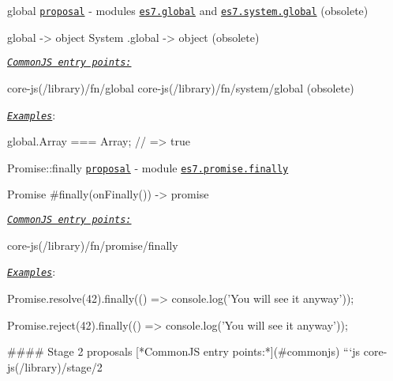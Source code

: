 \begin{DoxyItemize}
\item {\ttfamily global} \href{https://github.com/tc39/proposal-global}{\tt proposal} -\/ modules \href{https://github.com/zloirock/core-js/blob/v2.6.0/modules/es7.global.js}{\tt {\ttfamily es7.\+global}} and \href{https://github.com/zloirock/core-js/blob/v2.6.0/modules/es7.system.global.js}{\tt {\ttfamily es7.\+system.\+global}} (obsolete) 
\begin{DoxyCode}
global -> object
System
  .global -> object (obsolete)
\end{DoxyCode}
 \href{#commonjs}{\tt {\itshape Common\+JS entry points\+:}} 
\begin{DoxyCode}
core-js(/library)/fn/global
core-js(/library)/fn/system/global (obsolete)
\end{DoxyCode}
 \href{http://goo.gl/gEqMl7}{\tt {\itshape Examples}}\+: 
\begin{DoxyCode}
global.Array === Array; // => true
\end{DoxyCode}

\item {\ttfamily Promise\+::finally} \href{https://github.com/tc39/proposal-promise-finally}{\tt proposal} -\/ module \href{https://github.com/zloirock/core-js/blob/v2.6.0/modules/es7.promise.finally.js}{\tt {\ttfamily es7.\+promise.\+finally}} 
\begin{DoxyCode}
Promise
  #finally(onFinally()) -> promise
\end{DoxyCode}
 \href{#commonjs}{\tt {\itshape Common\+JS entry points\+:}} 
\begin{DoxyCode}
core-js(/library)/fn/promise/finally
\end{DoxyCode}
 \href{https://goo.gl/AhyBbJ}{\tt {\itshape Examples}}\+: 
\begin{DoxyCode}
Promise.resolve(42).finally(() => console.log('You will see it anyway'));

Promise.reject(42).finally(() => console.log('You will see it anyway'));

#### Stage 2 proposals
[*CommonJS entry points:*](#commonjs)
```js
core-js(/library)/stage/2
\end{DoxyCode}


\end{DoxyItemize}
